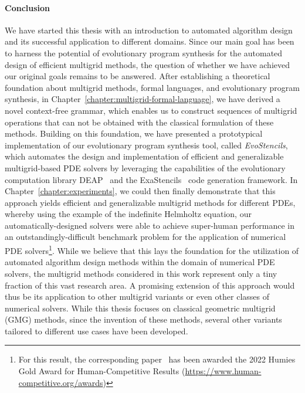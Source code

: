 \paragraph{Conclusion}
We have started this thesis with an introduction to automated algorithm design and its successful application to different domains.
Since our main goal has been to harness the potential of evolutionary program synthesis for the automated design of efficient multigrid methods, the question of whether we have achieved our original goals remains to be answered.
After establishing a theoretical foundation about multigrid methods, formal languages, and evolutionary program synthesis, in Chapter~\ref{chapter:multigrid-formal-language}, we have derived a novel context-free grammar, which enables us to construct sequences of multigrid operations that can not be obtained with the classical formulation of these methods.
Building on this foundation, we have presented a prototypical implementation of our evolutionary program synthesis tool, called \emph{EvoStencils}, which automates the design and implementation of efficient and generalizable multigrid-based PDE solvers by leveraging the capabilities of the evolutionary computation library DEAP~\cite{rainville2012deap} and the ExaStencils~\cite{lengauer2020exastencils} code generation framework.
In Chapter~\ref{chapter:experiments}, we could then finally demonstrate that this approach yields efficient and generalizable multigrid methods for different PDEs, whereby using the example of the indefinite Helmholtz equation, our automatically-designed solvers were able to achieve super-human performance in an outstandingly-difficult benchmark problem for the application of numerical PDE solvers\footnote{For this result, the corresponding paper~\cite{schmitt2022evolving} has been awarded the 2022 Humies Gold Award for Human-Competitive Results (\url{https://www.human-competitive.org/awards})}.
While we believe that this lays the foundation for the utilization of automated algorithm design methods within the domain of numerical PDE solvers, the multigrid methods considered in this work represent only a tiny fraction of this vast research area.
A promising extension of this approach would thus be its application to other multigrid variants or even other classes of numerical solvers.
While this thesis focuses on classical geometric multigrid (GMG) methods, since the invention of these methods, several other variants tailored to different use cases have been developed.
